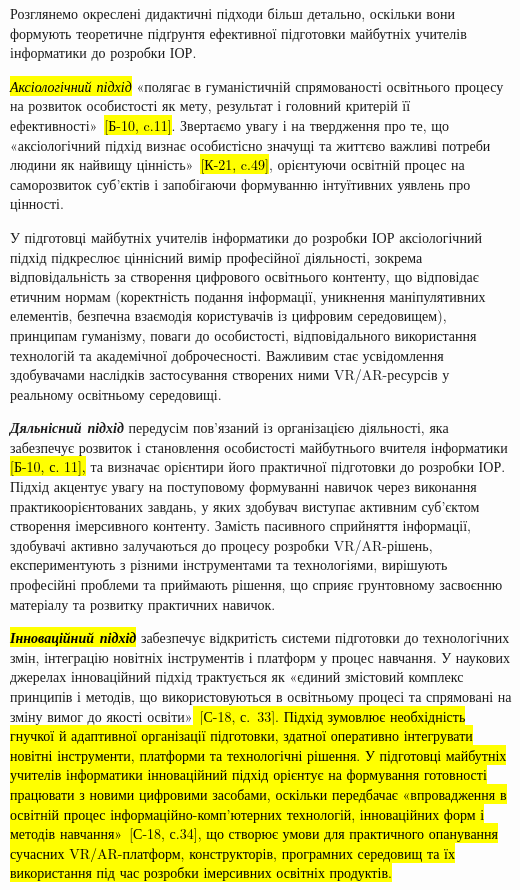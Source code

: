 Розглянемо окреслені дидактичні підходи більш детально, оскільки вони формують теоретичне підґрунтя ефективної підготовки майбутніх учителів інформатики до розробки ІОР.

\emph{\hl{Аксіологічний підхід}} «полягає в гуманістичній спрямованості освітнього процесу на розвиток особистості як мету, результат і головний критерій її ефективності»~\hl{{[}Б-10, c.11{]}}. Звертаємо увагу і на твердження про те, що «аксіологічний підхід визнає особистісно значущі та життєво важливі потреби людини як найвищу цінність»~\hl{{[}К-21, c.49{]}}, орієнтуючи освітній процес на саморозвиток суб'єктів і запобігаючи формуванню інтуїтивних уявлень про цінності.

У підготовці майбутніх учителів інформатики до розробки ІОР аксіологічний підхід підкреслює ціннісний вимір професійної діяльності, зокрема відповідальність за створення цифрового освітнього контенту, що відповідає етичним нормам (коректність подання інформації, уникнення маніпулятивних елементів, безпечна взаємодія користувачів із цифровим середовищем), принципам гуманізму, поваги до особистості, відповідального використання технологій та академічної доброчесності. Важливим стає усвідомлення здобувачами наслідків застосування створених ними VR/AR-ресурсів у реальному освітньому середовищі.

\emph{\textbf{Дяльнісний підхід}} передусім пов'язаний із організацією діяльності, яка забезпечує розвиток і становлення особистості майбутнього вчителя інформатики \hl{{[}Б-10, с. 11{]},} та визначає орієнтири його практичної підготовки до розробки ІОР. Підхід акцентує увагу на поступовому формуванні навичок через виконання практикоорієнтованих завдань, у яких здобувач виступає активним суб'єктом створення імерсивного контенту. Замість пасивного сприйняття інформації, здобувачі активно залучаються до процесу розробки VR/AR-рішень, експериментують з різними інструментами та технологіями, вирішують професійні проблеми та приймають рішення, що сприяє грунтовному засвоєнню матеріалу та розвитку практичних навичок.

\hl{\emph{\textbf{Інноваційний підхід}}} забезпечує відкритість системи підготовки до технологічних змін, інтеграцію новітніх інструментів і платформ у процес навчання. У наукових джерелах інноваційний підхід трактується як «єдиний змістовий комплекс принципів і методів, що використовуються в освітньому процесі та спрямовані на зміну вимог до якості освіти»\hl{~{[}С-18, с.~33{]}. Підхід зумовлює необхідність гнучкої й адаптивної організації підготовки, здатної оперативно інтегрувати новітні інструменти, платформи та технологічні рішення. У підготовці майбутніх учителів інформатики інноваційний підхід орієнтує на формування готовності працювати з новими цифровими засобами, оскільки передбачає «впровадження в освітній процес інформаційно-комп'ютерних технологій, інноваційних форм і методів навчання»~{[}С-18, с.34{]}, що створює умови для практичного опанування сучасних VR/AR-платформ, конструкторів, програмних середовищ та їх використання під час розробки імерсивних освітніх продуктів.}

